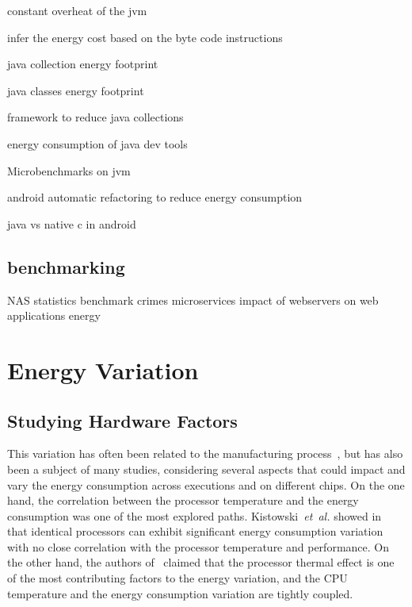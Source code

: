constant overheat of the jvm \cite{lafond2006energy}

infer the energy cost based on the byte code instructions \cite{ma2017biogeography}

java collection energy footprint  \cite{pinto2016comprehensive} \cite{fernandes2017assisting}

java classes energy footprint \cite{hasan2016energy}

framework to reduce java collections \cite{manotas2014seeds}

energy consumption of java dev tools \cite{baskar2013experimental}

Microbenchmarks on jvm \cite{longo2019reducing} \cite{baskar2013experimental}

android automatic refactoring to reduce energy consumption \cite{banerjee2016automated} \cite{rodriguez2017reducing}

java vs native c in android \cite{corral2014method}





\subsection{benchmarking}
NAS \cite{bailey_nas_nodate}
statistics \cite{he_statistics-based_2019}
benchmark crimes \cite{van_der_kouwe_benchmarking_2018}
microservices \cite{grambow_benchmarking_2020}
impact of webservers on web applications energy \cite{manotas_investigating_2013}


\section{Energy Variation}
\subsection{Studying Hardware Factors}
This variation has often been related to the manufacturing process~\cite{coles_comparing_2014}, but has also been a subject of many studies, considering several aspects that could impact and vary the energy consumption across executions and on different chips.
On the one hand, the correlation between the processor temperature and the energy consumption was one of the most explored paths.
Kistowski~\emph{et~al.} showed in~\cite{joakim_v_kisroski_variations_2016} that identical processors can exhibit significant energy consumption variation with no close correlation with the processor temperature and performance.
On the other hand, the authors of~\cite{wang_potential_2018} claimed that the processor thermal effect is one of the most contributing factors to the energy variation, and the CPU temperature and the energy consumption variation are tightly coupled.


